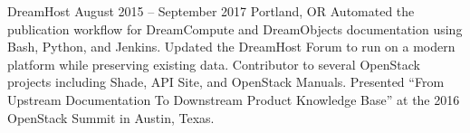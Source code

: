 {DreamHost}
{August 2015 -- September 2017}
{Portland, OR}
{Automated the publication workflow for DreamCompute and DreamObjects documentation using Bash, Python, and Jenkins. Updated the DreamHost Forum to run on a modern platform while preserving existing data. Contributor to several OpenStack projects including Shade, API Site, and OpenStack Manuals. Presented “From Upstream Documentation To Downstream Product Knowledge Base” at the 2016 OpenStack Summit in Austin, Texas.}
